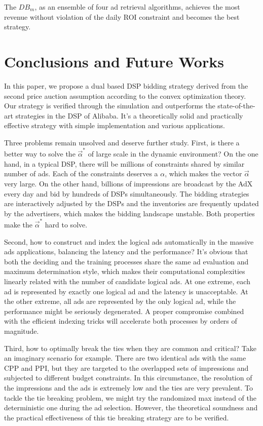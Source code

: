 \documentclass{article}
\newcommand{\valpha}{\vec{\alpha}}
\begin{document}
The $DB_m$, as an ensemble of four ad retrieval algorithms,
    achieves the most revenue without violation of the daily ROI constraint and becomes the best strategy.

\section{Conclusions and Future Works}

In this paper, we propose a dual based DSP bidding strategy
    derived from the second price auction assumption according to the convex optimization theory.
Our strategy is verified through the simulation and outperforms the state-of-the-art strategies in the DSP of Alibaba.
It's a theoretically solid and practically effective strategy with simple implementation and various applications.

Three problems remain unsolved and deserve further study.
First, is there a better way to solve the $\valpha^*$ of large scale in the dynamic environment?
On the one hand, in a typical DSP, there will be millions of constraints shared by similar number of ads.
Each of the constraints deserves a $\alpha$, which makes the vector $\valpha$ very large.
On the other hand, billions of impressions are broadcast by the AdX every day and bid by hundreds of DSPs simultaneously.
The bidding strategies are interactively adjusted by the DSPs and the inventories are frequently updated by the advertisers,
    which makes the bidding landscape unstable.
Both properties make the $\valpha^*$ hard to solve.

Second, how to construct and index the logical ads automatically in the massive ads applications, balancing the latency and the performance?
It's obvious that both the deciding and the training processes share the same ad evaluation and maximum determination style,
    which makes their computational complexities linearly related with the number of candidate logical ads.
At one extreme, each ad is represented by exactly one logical ad and the latency is unacceptable.
At the other extreme, all ads are represented by the only logical ad, while the performance might be seriously degenerated.
A proper compromise combined with the efficient indexing tricks will accelerate both processes by orders of magnitude.

Third, how to optimally break the ties when they are common and critical?
Take an imaginary scenario for example.
There are two identical ads with the same CPP and PPI,
    but they are targeted to the overlapped sets of impressions and subjected to different budget constraints.
In this circumstance, the resolution of the impressions and the ads is extremely low and the ties are very prevalent.
To tackle the tie breaking problem, we might try the randomized max instead of the deterministic one during the ad selection.
However, the theoretical soundness and the practical effectiveness of this tie breaking strategy are to be verified.
\end{document}
